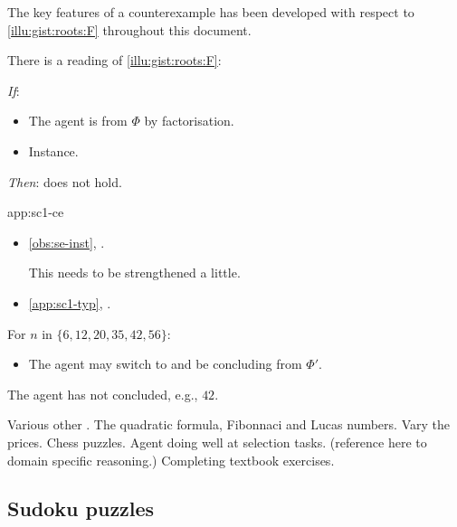 \begin{note}
  The key features of a counterexample has been developed with respect to \autoref{illu:gist:roots:F} throughout this document.

  \begin{application}%
    \label{app:sc1-ce}%
    There is a reading of \autoref{illu:gist:roots:F}:
    \begin{itenum}
    \item[\emph{If}:]
      \begin{itemize}
      \item
        The agent is \tCV{}  from \(\Phi\) by factorisation.
      \item
        {
          \color{blue}
          Instance.
        }
      \end{itemize}
    \item[\emph{Then}:]
      \issueInclusion{} does not hold.
    \end{itenum}
  \end{application}

  \begin{dets}{app:sc1-ce}
    \begin{itemize}
    \item
      \autoref{obs:se-inst}, \se{}.

      This needs to be strengthened a little.
    \item
      \autoref{app:sc1-typ}, .
    \end{itemize}
    For \(n\) in  \(\{6, 12, 20, 35, 42, 56\}\):
    \begin{itemize}
    \item
      The agent may switch to \rootsConEqGen{} and be concluding  from \(\Phi'\).
    \end{itemize}

    The agent has not concluded, e.g., \(42\).
  \end{dets}
\end{note}



\begin{note}
  Various other .
  The quadratic formula, Fibonnaci and Lucas numbers.
  Vary the prices.
  Chess puzzles.
  Agent doing well at selection tasks. (reference here to domain specific reasoning.)
  Completing textbook exercises.
\end{note}


\subsection{Sudoku puzzles}


